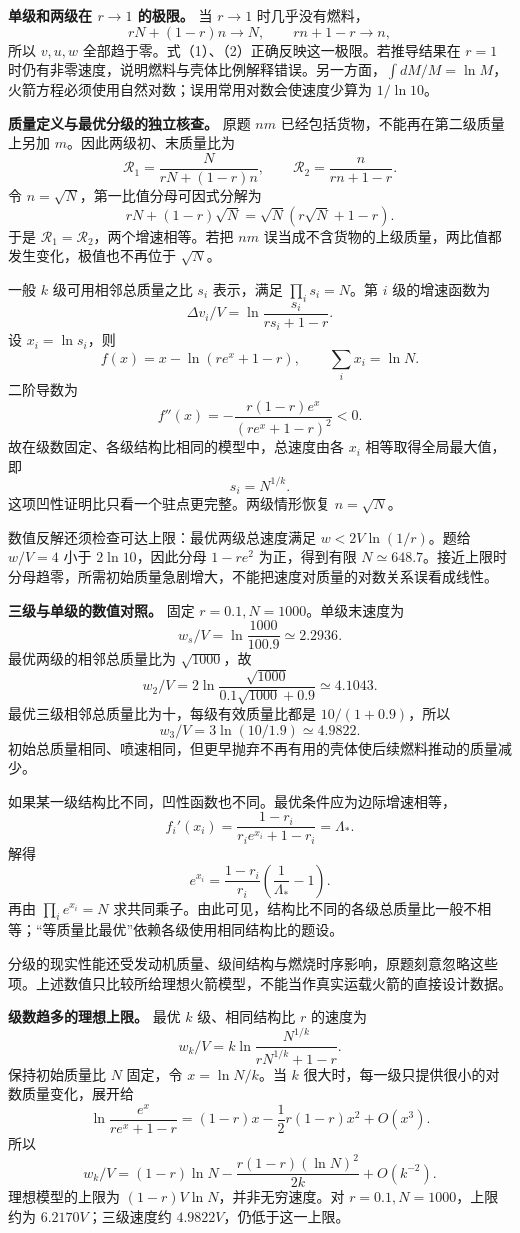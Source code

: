\documentclass[12pt,a4paper,UTF8]{ctexart}
\begin{document}
\textbf{单级和两级在 \(r\to1\) 的极限。} 当 \(r\to1\) 时几乎没有燃料，
\[
rN+(1-r)n\to N,\qquad rn+1-r\to n,
\] 所以 \(v,u,w\)
全部趋于零。式（1）、（2）正确反映这一极限。若推导结果在 \(r=1\)
时仍有非零速度，说明燃料与壳体比例解释错误。另一方面，\(\int dM/M=\ln M\)，火箭方程必须使用自然对数；误用常用对数会使速度少算为
\(1/\ln 10\)。

\textbf{质量定义与最优分级的独立核查。} 原题 \(nm\)
已经包括货物，不能再在第二级质量上另加 \(m\)。因此两级初、末质量比为 \[
\mathcal R_1=\frac{N}{rN+(1-r)n},\qquad
\mathcal R_2=\frac{n}{rn+1-r}.
\] 令 \(n=\sqrt N\)，第一比值分母可因式分解为 \[
rN+(1-r)\sqrt N=\sqrt N(r\sqrt N+1-r).
\] 于是 \(\mathcal R_1=\mathcal R_2\)，两个增速相等。若把 \(nm\)
误当成不含货物的上级质量，两比值都发生变化，极值也不再位于 \(\sqrt N\)。

一般 \(k\) 级可用相邻总质量之比 \(s_i\) 表示，满足 \(\prod_i s_i=N\)。第
\(i\) 级的增速函数为 \[
\Delta v_i/V=\ln\frac{s_i}{rs_i+1-r}.
\] 设 \(x_i=\ln s_i\)，则 \[
f(x)=x-\ln(re^x+1-r),\qquad \sum_i x_i=\ln N.
\] 二阶导数为 \[
f''(x)=-\frac{r(1-r)e^x}{(re^x+1-r)^2}<0.
\] 故在级数固定、各级结构比相同的模型中，总速度由各 \(x_i\)
相等取得全局最大值，即 \[
s_i=N^{1/k}.
\] 这项凹性证明比只看一个驻点更完整。两级情形恢复 \(n=\sqrt N\)。

数值反解还须检查可达上限：最优两级总速度满足 \(w<2V\ln(1/r)\)。题给
\(w/V=4\) 小于 \(2\ln10\)，因此分母 \(1-re^2\) 为正，得到有限
\(N\simeq648.7\)。接近上限时分母趋零，所需初始质量急剧增大，不能把速度对质量的对数关系误看成线性。

\textbf{三级与单级的数值对照。} 固定 \(r=0.1,N=1000\)。单级末速度为 \[
w_s/V=\ln\frac{1000}{100.9}\simeq2.2936.
\] 最优两级的相邻总质量比为 \(\sqrt{1000}\)，故 \[
w_2/V=2\ln\frac{\sqrt{1000}}{0.1\sqrt{1000}+0.9}\simeq4.1043.
\] 最优三级相邻总质量比为十，每级有效质量比都是 \(10/(1+0.9)\)，所以 \[
w_3/V=3\ln(10/1.9)\simeq4.9822.
\]
初始总质量相同、喷速相同，但更早抛弃不再有用的壳体使后续燃料推动的质量减少。

如果某一级结构比不同，凹性函数也不同。最优条件应为边际增速相等， \[
f_i'(x_i)=\frac{1-r_i}{r_ie^{x_i}+1-r_i}=\Lambda_*.
\] 解得 \[
e^{x_i}=\frac{1-r_i}{r_i}\left(\frac1{\Lambda_*}-1\right).
\] 再由 \(\prod_i e^{x_i}=N\)
求共同乘子。由此可见，结构比不同的各级总质量比一般不相等；``等质量比最优''依赖各级使用相同结构比的题设。

分级的现实性能还受发动机质量、级间结构与燃烧时序影响，原题刻意忽略这些项。上述数值只比较所给理想火箭模型，不能当作真实运载火箭的直接设计数据。

\textbf{级数趋多的理想上限。} 最优 \(k\) 级、相同结构比 \(r\) 的速度为
\[
w_k/V=k\ln\frac{N^{1/k}}{rN^{1/k}+1-r}.
\] 保持初始质量比 \(N\) 固定，令 \(x=\ln N/k\)。当 \(k\)
很大时，每一级只提供很小的对数质量变化，展开给 \[
\ln\frac{e^x}{re^x+1-r}
=(1-r)x-\frac12r(1-r)x^2+O(x^3).
\] 所以 \[
w_k/V=(1-r)\ln N-
\frac{r(1-r)(\ln N)^2}{2k}+O(k^{-2}).
\] 理想模型的上限为 \((1-r)V\ln N\)，并非无穷速度。对
\(r=0.1,N=1000\)，上限约为 \(6.2170V\)；三级速度约
\(4.9822V\)，仍低于这一上限。
\end{document}
